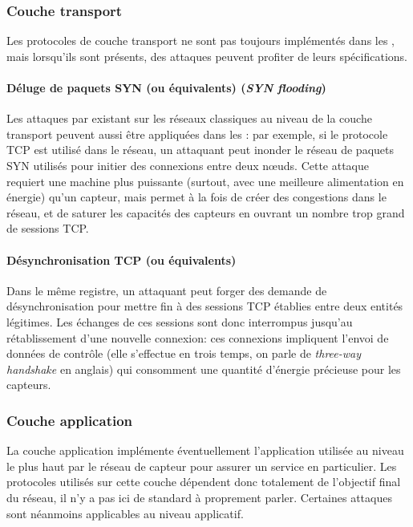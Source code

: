     \subsubsection{Couche transport}
Les protocoles de couche transport ne sont pas toujours implémentés dans les \rcsfs, mais lorsqu'ils sont présents, des attaques peuvent profiter de leurs spécifications.

        \paragraph{Déluge de paquets SYN (ou équivalents) (\textit{SYN flooding})}
Les attaques par \dds existant sur les réseaux classiques au niveau de la couche transport peuvent aussi être appliquées dans les \rcs: par exemple, si le protocole TCP est utilisé dans le réseau, un attaquant peut inonder le réseau de paquets SYN utilisés pour initier des connexions entre deux nœuds.
Cette attaque requiert une machine plus puissante (surtout, avec une meilleure alimentation en énergie) qu'un capteur, mais permet à la fois de créer des congestions dans le réseau, et de saturer les capacités des capteurs en ouvrant un nombre trop grand de sessions TCP.

        \paragraph{Désynchronisation TCP (ou équivalents)}
Dans le même registre, un attaquant peut forger des demande de désynchronisation pour mettre fin à des sessions TCP établies entre deux entités légitimes.
Les échanges de ces sessions sont donc interrompus jusqu'au rétablissement d'une nouvelle connexion: ces connexions impliquent l'envoi de données de contrôle (elle s'effectue en trois temps, on parle de \textit{three-way handshake} en anglais) qui consomment une quantité d'énergie précieuse pour les capteurs.

    \subsubsection{Couche application}
La couche application implémente éventuellement l'application utilisée au niveau le plus haut par le réseau de capteur pour assurer un service en particulier.
Les protocoles utilisés sur cette couche dépendent donc totalement de l'objectif final du réseau, il n'y a pas ici de standard à proprement parler.
Certaines attaques sont néanmoins applicables au niveau applicatif.

